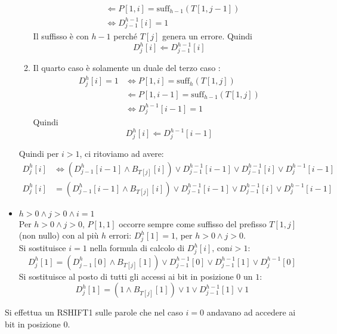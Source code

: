 \begin{itemize}
\begin{enumerate}
\begin{equation*}
\begin{split}
                & \Leftarrow P[1, i] = \mbox{suff}_{h-1}(T[1, j-1]) \\
                & \iff D^{h-1}_{j-1}[i] = 1
            \end{split}
        \end{equation*}
            Il suffisso è con $h-1$ perché $T[j]$ genera un errore.
            Quindi \[D^h_j[i] \Leftarrow D^{h-1}_{j-1}[i]\]
        \item Il quarto caso è solamente un duale del terzo caso :
        \begin{equation*}
            \begin{split}
                D^h_j[i] = 1 &\iff P[1, i] = \mbox{suff}_h(T[1, j])\\
                & \Leftarrow P[1, i-1] = \mbox{suff}_{h-1}(T[1, j]) \\
                & \iff D^{h-1}_{j}[i-1] = 1
            \end{split}
        \end{equation*}
             Quindi \[D^h_j[i] \Leftarrow D^{h-1}_{j}[i-1]\]
        \end{enumerate}
        Quindi per $i >1$, ci ritoviamo ad avere:
        \begin{equation*}
            \begin{split}
                D^h_j[i] & \iff  (D^h_{j-1}[i-1] \land B_{T[j]}[i]) \lor D^{h-1}_{j-1}[i-1] \lor D^{h-1}_{j-1}[i] \lor D^{h-1}_{j}[i-1] \\
                D^h_j[i] &=  (D^h_{j-1}[i-1] \land B_{T[j]}[i]) \lor D^{h-1}_{j-1}[i-1] \lor D^{h-1}_{j-1}[i] \lor D^{h-1}_{j}[i-1]
            \end{split}
        \end{equation*}
    \item $h>0 \land j>0 \land i = 1$\\
        Per $h>0 \land j>0$, $P[1,1]$ occorre sempre come suffisso del prefisso $T[1,j]$ (non nullo) con al più $h$ errori: $D^h_j[1]=1$, per $h>0 \land j>0$.\\
        
        Si sostituisce $i=1$ nella formula di calcolo di $D^h_j[i] \mbox{, con} i>1$: 
        \[D^h_j[1] = (D^h_{j-1}[0] \land B_{T[j]}[1]) \lor D^{h-1}_{j-1}[0] \lor D^{h-1}_{j-1}[1] \lor D^{h-1}_{j}[0]\]
        Si sostituisce al posto di tutti gli accessi ai bit in posizione $0$ un $1$: \[D^h_j[1] = (1 \land B_{T[j]}[1]) \lor 1 \lor D^{h-1}_{j-1}[1] \lor 1\]
\end{itemize}
Si effettua un RSHIFT1 sulle parole che nel caso $i=0$ andavano ad accedere ai bit in posizione $0$.\\
